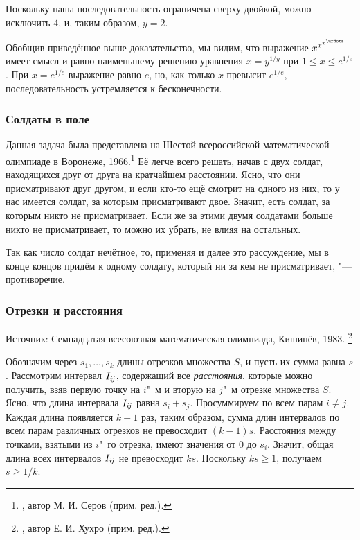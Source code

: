 \documentclass[twoside]{book}
\begin{document}
Поскольку наша последовательность ограничена сверху двойкой, можно исключить $4$, и, таким образом, $y=2$.\heart

Обобщив приведённое выше доказательство, мы видим, что выражение $x^{x^{x^{\urdots}}}$
имеет смысл и равно наименьшему решению уравнения $x=y^{1/y}$ при $1\le x\le e^{1/e}$.
При $x=e^{1/e}$ выражение равно $e$, но, как только $x$ превысит $e^{1/e}$, последовательность устремляется к бесконечности.

\subsubsection*{Солдаты в поле}%
Данная задача была представлена на Шестой всероссийской математической олимпиаде в Воронеже, 1966.\footnote{\cite[№72]{ВсМО}, автор М. И. Серов (прим. ред.).}
Её легче всего решать, начав с двух солдат, находящихся друг от друга на кратчайшем расстоянии.
Ясно, что они присматривают друг другом, и если кто-то ещё смотрит на одного из них, то у нас имеется солдат, за которым присматривают двое. 
Значит, есть солдат, за которым никто не присматривает.
Если же за этими двумя солдатами больше никто не присматривает, то можно их убрать, не влияя на остальных.

Так как число солдат нечётное, то, применяя и далее это рассуждение, мы в конце концов придём к одному солдату, который ни за кем не присматривает, "--- противоречие.\heart

\subsubsection*{Отрезки и расстояния} %

\indent

\medskip

{\small


Источник:
Семнадцатая всесоюзная математическая олимпиада, Кишинёв, 1983.%
\footnote{\cite[№369]{ВсМО}, автор  Е. И. Хухро (прим. ред.).}

}
\medskip

Обозначим через $s_1,\dots,s_k$ длины отрезков множества $S$,
и пусть их сумма равна $s$.
Рассмотрим интервал $I_{i\mkern-2mu j}$, содержащий все \emph{расстояния}, которые можно получить, взяв первую точку на $i$"~м и вторую на $j$"~м отрезке множества $S$.
Ясно, что длина интервала $I_{i\mkern-2mu j}$ равна $s_i+s_j$.
Просуммируем по всем парам $i\ne j$. Каждая длина появляется $k-1$ раз,
таким образом, сумма длин интервалов по всем парам различных отрезков не превосходит $(k-1) s$.
Расстояния между точками, взятыми из $i$"~го отрезка, имеют значения от $0$ до $s_i$.
Значит, общая длина всех интервалов $I_{i\mkern-2mu j}$ не превосходит $k s$.
Поскольку $k s\ge 1$, получаем $s\ge 1/k$.
\heart
\end{document}
